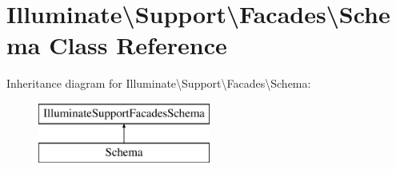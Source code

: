 \hypertarget{class_illuminate_1_1_support_1_1_facades_1_1_schema}{}\section{Illuminate\textbackslash{}Support\textbackslash{}Facades\textbackslash{}Schema Class Reference}
\label{class_illuminate_1_1_support_1_1_facades_1_1_schema}
Inheritance diagram for Illuminate\textbackslash{}Support\textbackslash{}Facades\textbackslash{}Schema\+:\begin{figure}[H]
\begin{center}
\leavevmode
\includegraphics[height=2.000000cm]{class_illuminate_1_1_support_1_1_facades_1_1_schema}
\end{center}
\end{figure}
